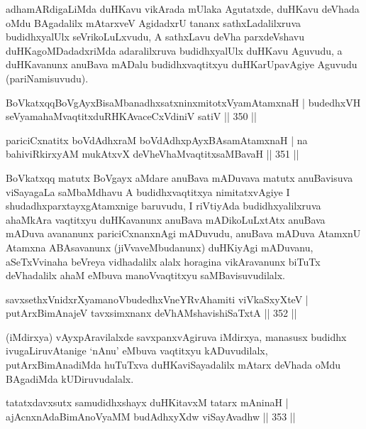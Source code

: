\begin{artha}
adhamARdigaLiMda duHKavu vikArada mUlaka Agutatxde, duHKavu deVhada oMdu BAgadalilx mAtarxveV AgidadxrU tananx sathxLadalilxruva budidhxyalUlx seVrikoLuLx\-vudu, A sathxLavu deVha parxdeVshavu duHKagoMDadadxriMda adaralilxruva budidhxyalUlx duHKavu Aguvudu, a duHKavanunx anuBava mADalu budidhxvaqtitxyu duHKarUpavAgiye Aguvudu (pariNamisuvudu).
\end{artha}


\begin{shl}
BoVkatxqqBoVgAyxBisaMbanadhxsatxninxmitotxV\s yamAtamxnaH |
budedhxVH seVyamahaMvaqtitxduRHKAvaceCxVdiniV satiV \hfill || 350 ||
\end{shl}

\begin{shl}
pariciCxnatitx boVdAdhxraM boVdAdhx\s pAyxBAsamAtamxnaH |
na bahiviRkirxyAM mukAtxvX deVheV\s haMvaqtitxsaMBavaH \hfill || 351 ||
\end{shl}

\begin{artha}
BoVkatxqq matutx BoVgayx aMdare anuBava mADuvava matutx anuBavisuva viSayagaLa saMbaMdhavu A budidhxvaqtitxya nimitatxvAgiye I shudadhxparxtayxgAtamxnige baru\-vudu, I riVtiyAda budidhxyalilxruva ahaMkAra vaqtitxyu duHKavanunx anuBava mADikoLuLxtAtx anuBava mADuva avananunx pariciCxnanxnAgi mADuvudu, anuBava mADuva AtamxnU Atamxna ABAsavanunx (jiVvaveMbudanunx) duHKiyAgi \-mADuvanu, aSeTxVvinaha beVreya vidhadalilx alalx horagina vikAravanunx biTuTx deVhadalilx ahaM eMbuva manoVvaqtitxyu saMBavisuvudilalx.
\end{artha}


\begin{shl}
savxsethxVnidxrXyamanoVbudedhxVneYRvAhamiti viVkaSxyXteV |
putArxBimAnajeV tavxsimxnanx deVhAMshavishiSaTxtA \hfill || 352 ||
\end{shl}

\begin{artha}
(iMdirxya) vAyxpAravilalxde savxpanxvAgiruva iMdirxya, manasusx budidhx ivugaLiruvAtanige `nAnu' eMbuva vaqtitxyu kADuvudilalx, putArxBimAnadiMda huTuTxva duHKaviSayadalilx mAtarx deVhada oMdu BAgadiMda kUDiruvudalalx.
\end{artha}


\begin{shl}
tatatxdavxsutx samudidhxshayx duHKitavxM tatarx mAninaH |
ajAcnxnAdaBimAnoV\s yaMM budAdhxyXdw viSayAvadhw \hfill || 353 ||
\end{shl}

